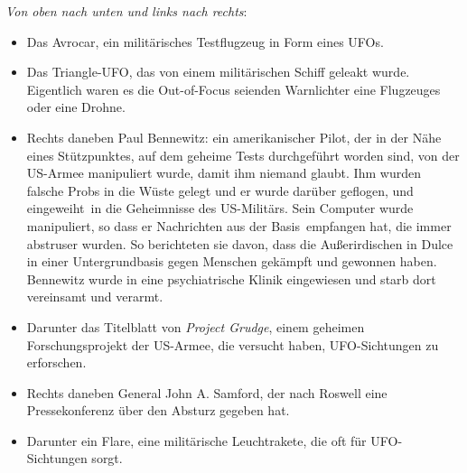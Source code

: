 \documentclass{scrartcl}
\begin{document}
\textit{Von oben nach unten und links nach rechts}:

\begin{itemize}
	\item Das Avrocar, ein militärisches Testflugzeug in Form eines UFOs. 
	\item Das Triangle-UFO, das von einem militärischen Schiff geleakt wurde. Eigentlich waren es die Out-of-Focus seienden Warnlichter eine Flugzeuges oder eine Drohne. 
	\item Rechts daneben Paul Bennewitz: ein amerikanischer Pilot, der in der Nähe eines Stützpunktes, auf dem geheime Tests durchgeführt worden sind, von der US-Armee manipuliert wurde, damit ihm niemand glaubt. Ihm wurden falsche Probs in die Wüste gelegt und er wurde darüber geflogen, und \frq eingeweiht\flq\ in die Geheimnisse des US-Militärs. Sein Computer wurde manipuliert, so dass er Nachrichten \frq aus der Basis\flq\ empfangen hat, die immer abstruser wurden. So berichteten sie davon, dass die Außerirdischen in Dulce in einer Untergrundbasis gegen Menschen gekämpft und gewonnen haben. Bennewitz wurde in eine psychiatrische Klinik eingewiesen und starb dort vereinsamt und verarmt.

	\item Darunter das Titelblatt von \textit{Project Grudge}, einem geheimen Forschungsprojekt der US-Armee, die versucht haben, UFO-Sichtungen zu erforschen. 
	\item Rechts daneben General John A. Samford, der nach Roswell eine Pressekonferenz über den Absturz gegeben hat.

	\item Darunter ein Flare, eine militärische Leuchtrakete, die oft für UFO-Sichtungen sorgt. 
\end{itemize}
\end{document}

